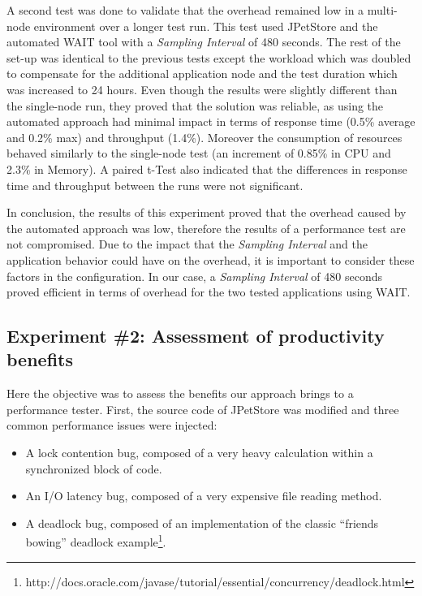\documentclass[runningheads,a4paper]{llncs}
\begin{document}
A second test was done to validate that the overhead remained low in a
multi-node environment over a longer test run. This test used JPetStore and the
automated WAIT tool with a \emph{Sampling Interval} of 480 seconds. The rest of
the set-up was identical to the previous tests except the workload which was doubled
to compensate for the additional application node and the test duration which
was increased to 24 hours. Even though the results were slightly different than the
single-node run, they proved that the solution was reliable, as using the
automated approach had minimal impact in terms of response time (0.5\% 
average and 0.2\% max) and throughput (1.4\%). Moreover the consumption
of resources behaved similarly to the single-node test (an increment of 0.85\%
in CPU and 2.3\% in Memory). A paired t-Test also indicated
that the differences in response time and throughput between the runs were
not significant.

In conclusion, the results of this experiment proved that the
overhead caused by the automated approach was low, therefore the results of a
performance test are not compromised. Due to the impact that the \emph{Sampling
Interval} and the application behavior could have on the overhead, it is important to 
consider these factors in the configuration. In our case, a \emph{Sampling
Interval} of 480 seconds proved efficient in terms of overhead for the two tested applications using WAIT.

\vspace{-7pt}
\subsection{Experiment \#2: Assessment of productivity benefits}
\label{Experiment_2_Results}
\vspace{-7pt}

Here the objective was to assess the benefits our approach brings to a
performance tester. First, the source code of JPetStore was modified and three
common performance issues were injected: 
\vspace{-7pt}
\begin{itemize}
	\item A lock contention bug, composed of a very heavy calculation within a
	synchronized block of code.
	\item An I/O latency bug, composed of a very expensive file reading method.
	\item A deadlock bug, composed of an implementation of the classic ``friends
	bowing'' deadlock
	example\footnote{http://docs.oracle.com/javase/tutorial/essential/concurrency/deadlock.html}.
\end{itemize}
\end{document}
